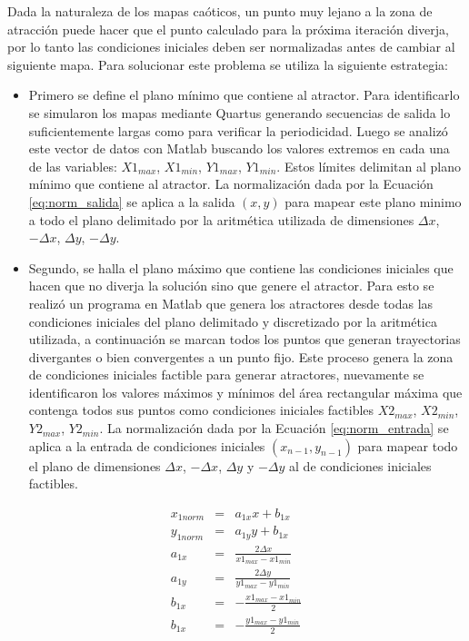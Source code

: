 Dada la naturaleza de los mapas caóticos, un punto muy lejano a la zona de atracción puede hacer que el punto calculado para la próxima iteración diverja, por lo tanto las condiciones iniciales deben ser normalizadas antes de cambiar al siguiente mapa.
Para solucionar este problema se utiliza la siguiente estrategia:
\begin{itemize}
	\item Primero se define el plano mínimo que contiene al atractor.
	Para identificarlo se simularon los mapas mediante Quartus generando secuencias de salida lo suficientemente largas como para verificar la periodicidad.
	Luego se analizó este vector de datos con Matlab buscando los valores extremos en cada una de las variables: $X1_{max}$, $X1_{min}$, $Y1_{max}$, $Y1_{min}$.
	Estos límites delimitan al plano mínimo que contiene al atractor.
	La normalización dada por la Ecuación \ref{eq:norm_salida} se aplica a la salida $\left(x,y\right)$ para mapear este plano minimo a todo el plano delimitado por la aritmética utilizada de dimensiones $\Delta x$, $-\Delta x$, $\Delta y$, $-\Delta y$.
	\item Segundo, se halla el plano máximo que contiene las condiciones iniciales que hacen que no diverja la solución sino que genere el atractor.
	Para esto se realizó un programa en Matlab que genera los atractores desde todas las condiciones iniciales del plano delimitado y discretizado por la aritmética utilizada, a continuación se marcan todos los puntos que generan trayectorias divergantes o bien convergentes a un punto fijo. 
	Este proceso genera la zona de condiciones iniciales factible para generar atractores, nuevamente se identificaron los valores máximos y mínimos del área rectangular máxima que contenga todos sus puntos como condiciones iniciales factibles $X2_{max}$, $X2_{min}$, $Y2_{max}$, $Y2_{min}$. 
	La normalización dada por la Ecuación \ref{eq:norm_entrada} se aplica a la entrada de condiciones iniciales $\left(x_{n-1},y_{n-1}\right)$ para mapear todo el plano de dimensiones $\Delta x$, $-\Delta x$, $\Delta y$ y $-\Delta y$ al de condiciones iniciales factibles.
\end{itemize}
%
\begin{eqnarray}\label{eq:norm_salida}
x_{1norm}&=& a_{1x} x+b_{1x} \nonumber\\
y_{1norm}&=& a_{1y} y+b_{1x} \nonumber\\
a_{1x}&=& \frac{2\Delta x}{x1_{max}-x1_{min}} \nonumber\\
a_{1y}&=& \frac{2\Delta y}{y1_{max}-y1_{min}} \nonumber\\
b_{1x}&=& -\frac{x1_{max}-x1_{min}}{2} \nonumber\\
b_{1x}&=& -\frac{y1_{max}-y1_{min}}{2}
\end{eqnarray}
